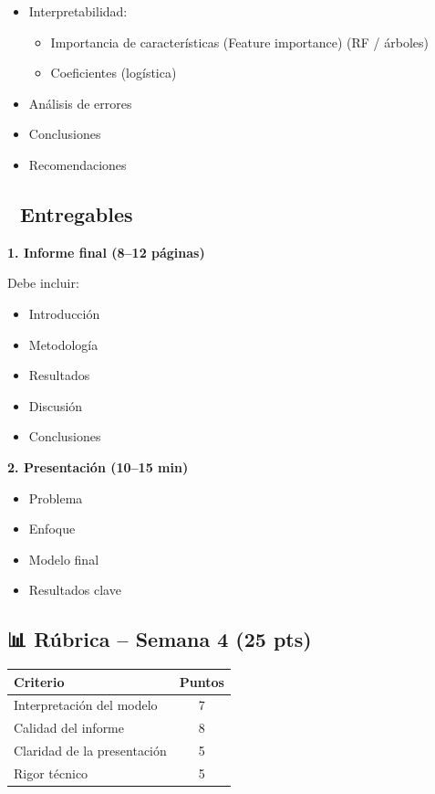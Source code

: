 \documentclass[11pt,a4paper]{article}
\begin{document}
\begin{itemize}[leftmargin=1.5cm]
\item Interpretabilidad:
\begin{itemize}[leftmargin=0.8cm]
\item Importancia de características (Feature importance) (RF / árboles)
\item Coeficientes (logística)
\end{itemize}
\item Análisis de errores
\item Conclusiones
\item Recomendaciones
\end{itemize}

\subsection*{📌 Entregables}

\textbf{1. Informe final (8--12 páginas)}

Debe incluir:

\begin{itemize}[leftmargin=1.5cm]
\item Introducción
\item Metodología
\item Resultados
\item Discusión
\item Conclusiones
\end{itemize}

\textbf{2. Presentación (10--15 min)}

\begin{itemize}[leftmargin=1.5cm]
\item Problema
\item Enfoque
\item Modelo final
\item Resultados clave
\end{itemize}

\subsection*{📊 Rúbrica -- Semana 4 (25 pts)}

\begin{table}[H]
\centering
\begin{tabular}{lc}
\toprule
\textbf{Criterio} & \textbf{Puntos} \\
\midrule
Interpretación del modelo & 7 \\
Calidad del informe & 8 \\
Claridad de la presentación & 5 \\
Rigor técnico & 5 \\
\bottomrule
\end{tabular}
\end{table}
\end{document}
